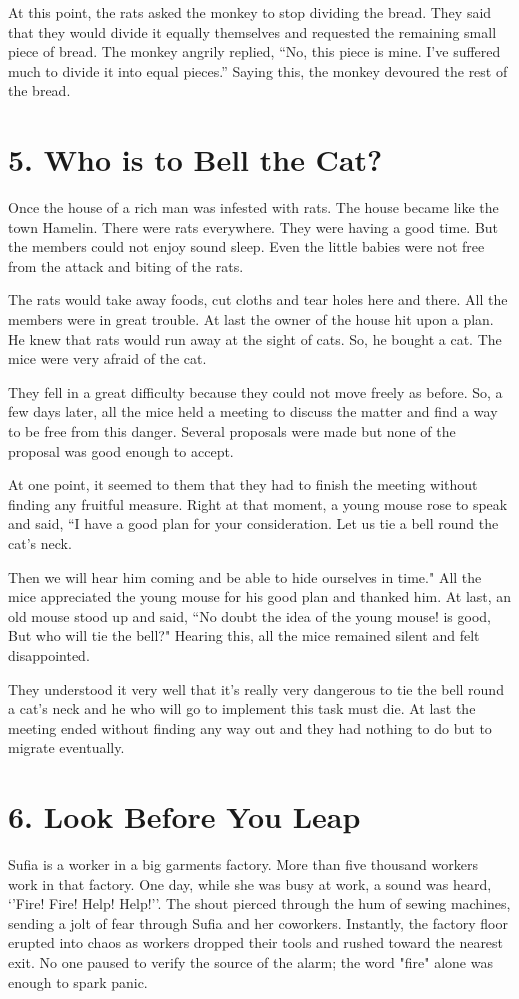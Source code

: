 \documentclass{article}
\begin{document}
At this point, the rats asked the monkey to stop dividing the bread. They said that they would divide it equally themselves and requested the remaining small piece of bread. The monkey angrily replied, “No, this piece is mine. I’ve suffered much to divide it into equal pieces.” Saying this, the monkey devoured the rest of the bread.

\section*{5. Who is to Bell the Cat?}
Once the house of a rich man was infested with rats. The house became like the town Hamelin. There were rats everywhere. They were having a good time. But the members could not enjoy sound sleep. Even the little babies were not free from the attack and biting of the rats.

The rats would take away foods, cut cloths and tear holes here and there. All the members were in great trouble. At last the owner of the house hit upon a plan. He knew that rats would run away at the sight of cats. So, he bought a cat. The mice were very afraid of the cat.

They fell in a great difficulty because they could not move freely as before. So, a few days later, all the mice held a meeting to discuss the matter and find a way to be free from this danger. Several proposals were made but none of the proposal was good enough to accept.

At one point, it seemed to them that they had to finish the meeting without finding any fruitful measure. Right at that moment, a young mouse rose to speak and said, “I have a good plan for your consideration. Let us tie a bell round the cat's neck.

Then we will hear him coming and be able to hide ourselves in time." All the mice appreciated the young mouse for his good plan and thanked him. At last, an old mouse stood up and said, “No doubt the idea of the young mouse! is good, But who will tie the bell?" Hearing this, all the mice remained silent and felt disappointed.

They understood it very well that it's really very dangerous to tie the bell round a cat's neck and he who will go to implement this task must die. At last the meeting ended without finding any way out and they had nothing to do but to migrate eventually.

\section*{6. Look Before You Leap}
Sufia is a worker in a big garments factory. More than five thousand workers work in that factory. One day, while she was busy at work, a sound was heard, ‘’Fire! Fire! Help! Help!’’. The shout pierced through the hum of sewing machines, sending a jolt of fear through Sufia and her coworkers. Instantly, the factory floor erupted into chaos as workers dropped their tools and rushed toward the nearest exit. No one paused to verify the source of the alarm; the word "fire" alone was enough to spark panic.
\end{document}
